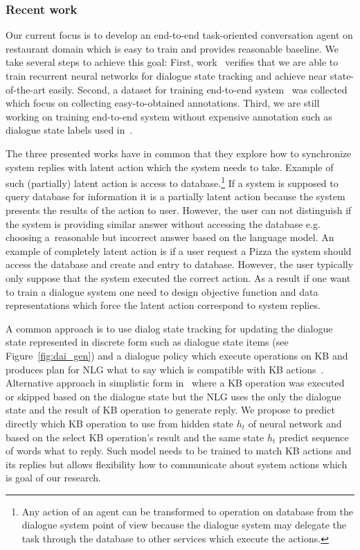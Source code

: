 \documentclass[11pt]{article}
\begin{document}
\subsubsection*{Recent work}
Our current focus is to develop an end-to-end task-oriented conversation agent on restaurant domain which is easy to train and provides reasonable baseline.
We take several steps to achieve this goal:
First, work~\cite{platek_recurrent_2016} verifies that we are able to train recurrent neural networks for dialogue state tracking and achieve near state-of-the-art easily. 
Second, a dataset for training end-to-end system~\cite{platek2016wochat} was collected which focus on collecting easy-to-obtained annotations.
Third, we are still working on training end-to-end system without expensive annotation such as dialogue state labels used in~\cite{wen_networkbased_2016}.

The three presented works have in common that they explore how to synchronize system replies with latent action which the system needs to take.
Example of such (partially) latent action is access to database.\footnote{Any action of an agent can be transformed to operation on database from the dialogue system point of view because the dialogue system may delegate the task through the database to other services which execute the actions.}
If a system is supposed to query database for information it is a partially latent action because the system presents the results of the action to user.
However, the user can not distinguish if the system is providing similar answer without accessing the database e.g. choosing a~reasonable but incorrect answer based on the language model.
An example of completely latent action is if a user request a Pizza the system should access the database and create and entry to database.
However, the user typically only suppose that the system executed the correct action.
As a result if one want to train a dialogue system one need to design objective function and data representations which force the latent action correspond to system replies.

A common approach is to use dialog state tracking for updating the dialogue state represented in discrete form such as dialogue state items (see Figure~\ref{fig:dai_gen}) and a dialogue policy which execute operations on KB and produces plan for NLG what to say which is compatible with KB actions~\cite{dusek_sequence2sequence_2016,young2010hidden}.
Alternative approach in simplistic form in~\cite{wen_networkbased_2016} where a KB operation was executed or skipped based on the dialogue state but the NLG uses the only the dialogue state and the result of KB operation to generate reply.
We propose to predict directly which KB operation to use from hidden state $h_t$ of neural network and based on the select KB operation's result and the same state $h_t$ predict sequence of words what to reply.
Such model needs to be trained to match KB actions and its replies but allows flexibility how to communicate about system actions which is goal of our research.
\end{document}
